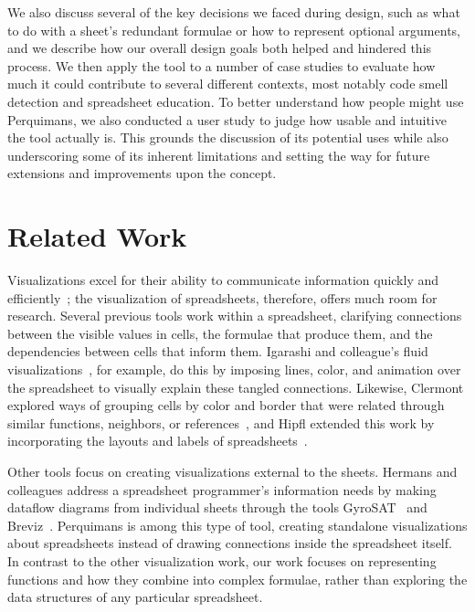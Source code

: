 \documentclass[conference]{IEEEtran}
\newcommand{\toolname}{Perquimans\xspace} \newcommand{\toolnameend}{Perquimans}
\begin{document}
	We also discuss several of the key decisions we faced during design, such as
	what to do with a sheet's redundant formulae or how to represent optional
	arguments, and we describe how our overall design goals both helped and
	hindered this process. We then apply the tool to a number of case studies to
	evaluate how much it could contribute to several different contexts, most
	notably code smell detection and spreadsheet education. To better understand
	how people might use \toolnameend, we also conducted a user study to judge how
	usable and intuitive the tool actually is. This grounds the discussion of its
	potential uses while also underscoring some of its inherent limitations and
	setting the way for future extensions and improvements upon the concept.
	
	\section{Related Work} \label{related-work} Visualizations excel for their
	ability to communicate information quickly and
	efficiently~\cite{baeza1999modern}; the visualization of spreadsheets,
	therefore, offers much room for research. Several previous tools work
	within a spreadsheet, clarifying connections between the visible
	values in cells, the formulae that produce them, and the dependencies between
	cells that inform them. Igarashi and colleague's fluid
	visualizations~\cite{igarashi1998fluid}, for example, do this by imposing
	lines, color, and animation over the spreadsheet to visually explain these
	tangled connections. Likewise, Clermont explored ways of grouping cells by
	color and border that were related through similar functions, neighbors, or
	references~\cite{clermont2003scalable}, and Hipfl extended this work by
	incorporating the layouts and labels of spreadsheets~\cite{hipfl2008using}.
	
	Other tools focus on creating visualizations external to the sheets. Hermans
	and colleagues address a spreadsheet programmer's information needs by making
	dataflow diagrams from individual sheets through the tools
	GyroSAT~\cite{hermans2011supporting} and Breviz~\cite{hermans2011breviz}.
	\toolname is among this type of tool, creating standalone visualizations about
	spreadsheets instead of drawing connections inside the spreadsheet itself. In
	contrast to the other visualization work, our work focuses on representing
	functions and how they combine into complex formulae, rather than exploring the
	data structures of any particular spreadsheet. 
	
\end{document}
